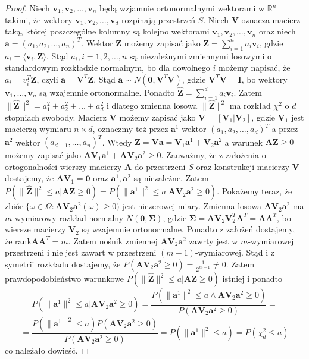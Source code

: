 \documentclass[12pt]{mwart}
\begin{document}
\begin{proof}
Niech $\pmb{v}_1,\pmb{v}_2,\dots,\pmb{v}_n$ będą wzjamnie ortonormalnymi wektorami w $\mathbb{R}^n$ takimi, że wektory $\pmb{v}_1,\pmb{v}_2,\dots,\pmb{v}_d$ rozpinają przestrzeń $S$. Niech $\pmb{V}$ oznacza macierz taką, której poszczególne kolumny są kolejno wektorami $\pmb{v}_1,\pmb{v}_2,\dots,\pmb{v}_n$ oraz niech $\pmb{a}=(a_1,a_2,\dots,a_n)^T$. Wektor $\pmb{Z}$ możemy zapisać jako $\pmb{Z}=\sum_{i=1}^n{a_i \pmb{v}_i}$, gdzie $a_i=\langle \pmb{v}_i, \pmb{Z}\rangle$. Stąd $a_i,i=1,2,\dots,n$ są niezależnymi zmiennymi losowymi o standardowym rozkładzie normalnym, bo dla dowolnego $i$ możemy napisać, że $a_i=v_i^T\pmb{Z}$, czyli $\pmb{a}=\pmb{V}^T\pmb{Z}$. Stąd $\pmb{a}\sim N(\pmb{0}, \pmb{V}^T\pmb{V})$, gdzie $\pmb{V}^T\pmb{V}=\pmb{I}$, bo wektory $\pmb{v}_1,\dots,\pmb{v}_n$ są wzajemnie ortonormalne. Ponadto $\hat{\pmb{Z}}=\sum_{i=1}^d{a_i \pmb{v}_i}$. Zatem $\|\hat{\pmb{Z}}\|^2=a_1^2+a_2^2+\dots +a_d^2$ i dlatego zmienna losowa $\|\hat{\pmb{Z}}\|^2$ ma rozkład $\chi^2$ o $d$ stopniach swobody. Macierz $\pmb{V}$ możemy zapisać jako $\pmb{V}=[\pmb{V}_1|\pmb{V}_2]$, gdzie $\pmb{V}_1$ jest macierzą wymiaru $n\times d$, oznaczmy też przez $\pmb{a}^1$ wektor $(a_1,a_2,\dots,a_d)^T$ a przez $\pmb{a}^2$ wektor $(a_{d+1},\dots,a_n)^T$. Wtedy $\pmb{Z}=\pmb{Va}=\pmb{V}_1\pmb{a}^1+\pmb{V}_2\pmb{a}^2$ a warunek $\pmb{AZ}\geq 0$ możemy zapisać jako $\pmb{AV}_1\pmb{a}^1+\pmb{AV}_2\pmb{a}^2\geq 0$. Zauważmy, że z założenia o ortogonalności wierszy macierzy $\pmb{A}$ do przestrzeni $S$ oraz konstrukcji macierzy $\pmb{V}$ dostajemy, że $\pmb{AV}_1=\pmb{0}$ oraz $\pmb{a}^1,\pmb{a}^2$ są niezależne. Zatem $P(\|\hat{\pmb{Z}}\|^2\leq a |\pmb{AZ}\geq 0)=P(\|\pmb{a}^1\|^2\leq a|\pmb{AV}_2\pmb{a}^2\geq 0)$. Pokażemy teraz, że zbiór $\{\omega\in \Omega\colon \pmb{AV}_2\pmb{a}^2(\omega)\geq 0)$ jest niezerowej miary. Zmienna losowa $\pmb{AV}_2\pmb{a}^2$ ma $m$-wymiarowy rozkład normalny $N(\pmb{0},\pmb{\Sigma})$, gdzie $\pmb{\Sigma}=\pmb{AV}_2\pmb{V}_2^T\pmb{A}^T=\pmb{AA}^T$, bo wiersze macierzy $\pmb{V}_2$ są wzajemnie ortonormalne. Ponadto z założeń dostajemy, że $\textrm{rank}\pmb{AA}^T=m$. Zatem nośnik zmiennej $\pmb{AV}_2\pmb{a}^2$ zawrty jest w $m$-wymiarowej przestrzeni i nie jest zawart w przestrzeni $(m-1)$-wymiarowej. Stąd i z symetrii rozkładu dostajemy, że $P(\pmb{AV}_2\pmb{a}^2\geq 0)=\frac{1}{2^{m-1}}\neq 0$. Zatem prawdopodobieństwo warunkowe $P(\|\hat{\pmb{Z}}\|^2\leq a |\pmb{AZ}\geq 0)$ istniej i ponadto  $$P(\|\pmb{a}^1\|^2\leq a|\pmb{AV}_2\pmb{a}^2\geq 0)=\frac{P(\|\pmb{a}^1\|^2\leq a\land\pmb{AV}_2\pmb{a}^2\geq 0)}{P(\pmb{AV}_2\pmb{a}^2\geq 0)}=$$ $$=\frac{P(\|\pmb{a}^1\|^2\leq a)P(\pmb{AV}_2\pmb{a}^2\geq 0)}{P(\pmb{AV}_2\pmb{a}^2\geq 0)}=P(\|\pmb{a}^1\|^2\leq a)=P(\chi^2_d\leq a)$$ co należało dowieść.
\end{proof}
\end{document}
